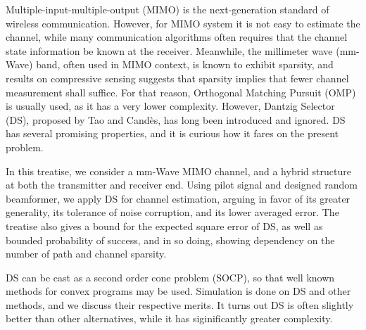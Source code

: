 
\starttitle [title={Abstract}]

Multiple-input-multiple-output (MIMO) is the next-generation standard of wireless communication.
However, for MIMO system it is not easy to estimate the channel, while many communication algorithms often requires that the channel state information be known at the receiver.
Meanwhile, the millimeter wave (mm-Wave) band, often used in MIMO context, is known to exhibit sparsity, and results on compressive sensing suggests that sparsity implies that fewer channel measurement shall suffice.
For that reason, Orthogonal Matching Pursuit (OMP) is usually used, as it has a very lower complexity.
However, Dantzig Selector (DS), proposed by Tao and Candès, has long been introduced and ignored.
DS has several promising properties, and it is curious how it fares on the present problem.

In this treatise, we consider a mm-Wave MIMO channel, and a hybrid structure at both the transmitter and receiver end.
Using pilot signal and designed random beamformer, we apply DS for channel estimation, arguing in favor of its greater generality, its tolerance of noise corruption, and its lower averaged error.
The treatise also gives a bound for the expected square error of DS, as well as bounded probability of success, and in so doing, showing dependency on the number of path and channel sparsity.

DS can be cast as a second order cone problem (SOCP), so that well known methods for convex programs may be used.
Simulation is done on DS and other methods, and we discuss their respective merits.
It turns out DS is often slightly better than other alternatives, while it has siginificantly greater complexity.


\stoptitle
